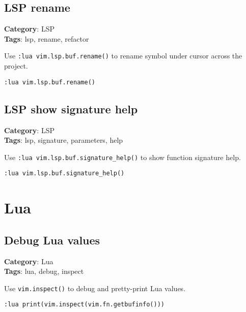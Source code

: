 {{{{{\section{LSP rename}

\textbf{Category}: LSP\\ \textbf{Tags}: lsp, rename, refactor
\vspace{0.5cm}

Use {\footnotesize \Verb§:lua vim.lsp.buf.rename()§} to rename symbol under cursor across the project.

\begin{Exa*}{}
\begin{Verbatim}[fontsize=\footnotesize, breaklines, breakanywhere]
:lua vim.lsp.buf.rename()
\end{Verbatim}
\end{Exa*}

\section{LSP show signature help}

\textbf{Category}: LSP\\ \textbf{Tags}: lsp, signature, parameters, help
\vspace{0.5cm}

Use {\footnotesize \Verb§:lua vim.lsp.buf.signature_help()§} to show function signature help.

\begin{Exa*}{}
\begin{Verbatim}[fontsize=\footnotesize, breaklines, breakanywhere]
:lua vim.lsp.buf.signature_help()
\end{Verbatim}
\end{Exa*}

\chapter{Lua}
\section{Debug Lua values}

\textbf{Category}: Lua\\ \textbf{Tags}: lua, debug, inspect
\vspace{0.5cm}

Use {\footnotesize \Verb§vim.inspect()§} to debug and pretty-print Lua values.

\begin{Exa*}{}
\begin{Verbatim}[fontsize=\footnotesize, breaklines, breakanywhere]
:lua print(vim.inspect(vim.fn.getbufinfo()))
\end{Verbatim}
\end{Exa*}

}}}}}
